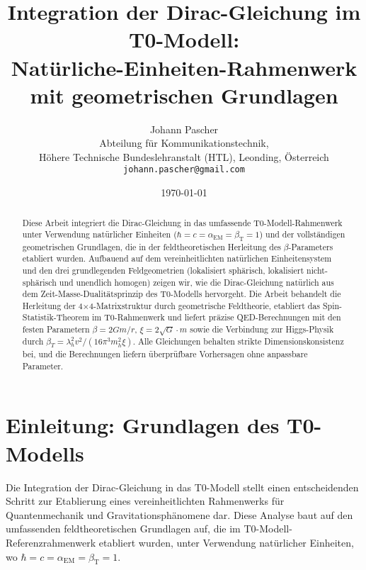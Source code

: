 \documentclass[12pt,a4paper]{article}
\begin{document}
	
	\title{Integration der Dirac-Gleichung im T0-Modell: \\Natürliche-Einheiten-Rahmenwerk mit geometrischen Grundlagen}
	\author{Johann Pascher\\
		Abteilung für Kommunikationstechnik, \\Höhere Technische Bundeslehranstalt (HTL), Leonding, Österreich\\
		\texttt{johann.pascher@gmail.com}}
	\date{\today}
	
	\maketitle
	
	\begin{abstract}
		Diese Arbeit integriert die Dirac-Gleichung in das umfassende T0-Modell-Rahmenwerk unter Verwendung natürlicher Einheiten ($\hbar = c = \alpha_{\text{EM}} = \beta_{\text{T}} = 1$) und der vollständigen geometrischen Grundlagen, die in der feldtheoretischen Herleitung des $\beta$-Parameters etabliert wurden. Aufbauend auf dem vereinheitlichten natürlichen Einheitensystem und den drei grundlegenden Feldgeometrien (lokalisiert sphärisch, lokalisiert nicht-sphärisch und unendlich homogen) zeigen wir, wie die Dirac-Gleichung natürlich aus dem Zeit-Masse-Dualitätsprinzip des T0-Modells hervorgeht. Die Arbeit behandelt die Herleitung der 4×4-Matrixstruktur durch geometrische Feldtheorie, etabliert das Spin-Statistik-Theorem im T0-Rahmenwerk und liefert präzise QED-Berechnungen mit den festen Parametern $\beta = 2Gm/r$, $\xi = 2\sqrt{G} \cdot m$ sowie die Verbindung zur Higgs-Physik durch $\beta_T = \lambda_h^2 v^2/(16\pi^3 m_h^2 \xi)$. Alle Gleichungen behalten strikte Dimensionskonsistenz bei, und die Berechnungen liefern überprüfbare Vorhersagen ohne anpassbare Parameter.
	\end{abstract}
	
	\newpage
	\tableofcontents
	\newpage
	
	\section{Einleitung: Grundlagen des T0-Modells}
	\label{sec:einleitung}
	
	Die Integration der Dirac-Gleichung in das T0-Modell stellt einen entscheidenden Schritt zur Etablierung eines vereinheitlichten Rahmenwerks für Quantenmechanik und Gravitationsphänomene dar. Diese Analyse baut auf den umfassenden feldtheoretischen Grundlagen auf, die im T0-Modell-Referenzrahmenwerk etabliert wurden, unter Verwendung natürlicher Einheiten, wo $\hbar = c = \alpha_{\text{EM}} = \beta_{\text{T}} = 1$.
	
\end{document}
